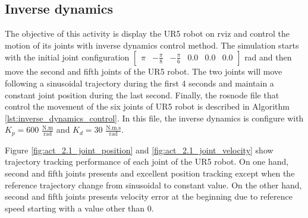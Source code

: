 
\subsection{Inverse dynamics}
The objective of this activity is display the UR5 robot on rviz and control the motion of its joints with inverse dynamics control method. The simulation starts with the initial joint configuration $\begin{bmatrix} \pi & -\frac{\pi}{8} & -\frac{\pi}{6} & 0.0 & 0.0 & 0.0 \end{bmatrix}$ rad and then move the second and fifth joints of the UR5 robot. The two joints will move following a sinusoidal trajectory during the first 4 seconds and maintain a constant joint position during the last second. Finally, the rosnode file that control the movement of the six joints of UR5 robot is described in Algorithm \ref{lst:inverse_dynamics_control}. In this file, the inverse dynamics is configure with $K_p=600$ $\mathrm{\frac{N.m}{rad}}$ and $K_d=30$ $\mathrm{\frac{N.m.s}{rad}}$. 

Figure \ref{fig:act_2.1_joint_position} and \ref{fig:act_2.1_joint_velocity} show trajectory tracking performance of each joint of the UR5 robot. On one  hand, second and fifth joints presents and excellent position tracking except when the reference trajectory change from sinusoidal to constant value. On the other hand, second and fifth joints presents velocity error at the beginning due to reference speed starting with a value other than 0.

